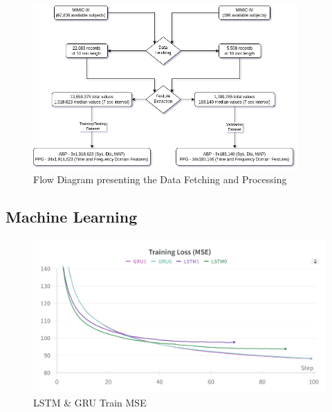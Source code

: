 \begin{figure}[h]
    \centering
    \includegraphics[width=0.9\textwidth]{images/results/flow_diagram}
    \caption{Flow Diagram presenting the Data Fetching and Processing}
    \label{fig:data_flow}
\end{figure}

\subsection{Machine Learning}
\label{subsec:machine_learning}


\begin{figure}[h]
    \centering
    \includegraphics[width=0.4\linewidth]{images/results/LSTM_GRU_Train_mse}
    \caption{LSTM \& GRU Train MSE}
    \label{fig:train_mse}
\end{figure}

